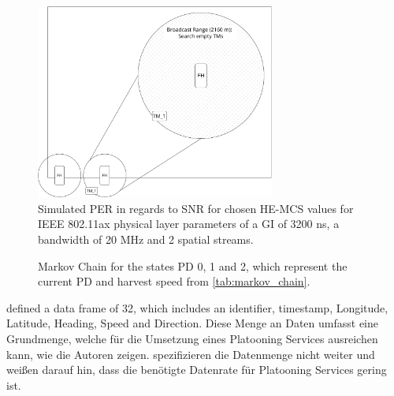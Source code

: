 \begin{figure}[H]%
	\centering
	\includegraphics[width=0.7\textwidth]{figures/drawings-INIT}
	\caption{Simulated PER in regards to SNR for chosen HE-MCS values for IEEE 802.11ax physical layer parameters
			of a GI of 3200 ns, a bandwidth of 20 MHz and 2 spatial streams.}
	\label{fig:PlatooningInit}%
\end{figure}

\begin{figure}
\centering
{}
\caption{Markov Chain for the states \acs{PD} 0, 1 and 2, which represent the current \acf{PD} and harvest speed from \autoref{tab:markov_chain}.}
\label{fig:ConnectionStates}
\end{figure}


\textcite{zhang_method_2009} defined a data frame of \SI{32}{\byte}, which includes an identifier, timestamp, Longitude, Latitude, Heading, Speed and Direction.
Diese Menge an Daten umfasst eine Grundmenge, welche für die Umsetzung eines Platooning Services ausreichen kann, wie die Autoren zeigen.
\textcite{schlingmann_aef_2019} spezifizieren die Datenmenge nicht weiter und weißen darauf hin, dass die benötigte Datenrate für Platooning Services gering ist.

